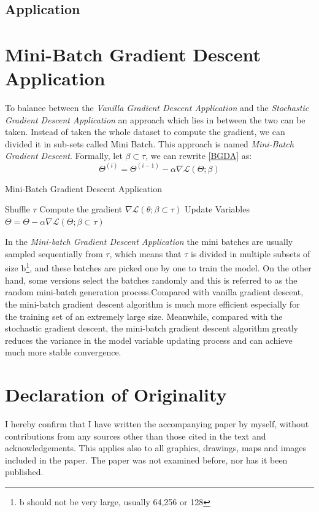 \documentclass[conference]{IEEEtran}
\begin{document}
\subsection{Application}


\section{Mini-Batch Gradient Descent Application}


To balance between the \textit{Vanilla Gradient Descent Application} and the  \textit{Stochastic Gradient Descent Application} an approach which lies in between the two can be taken. Instead of taken the whole dataset to compute the gradient, we can divided it in sub-sets called Mini Batch. This approach is named \textit{Mini-Batch Gradient Descent}. 
Formally, let $\beta \subset \tau$, we can rewrite \eqref{BGDA} as:
\begin{equation}
    \Theta^{(i)} = \Theta^{(i-1)} - \alpha\nabla\mathscr{L}(\Theta;\beta )\label{eq:MBGDA}
\end{equation}

\begin{algorithm}
\caption{Mini-Batch Gradient Descent Application}\label{MBGDA}
\begin{algorithmic}[1]
\State Shuffle $\tau$
\State Compute the gradient $\nabla\mathscr{L}(\theta;\beta \subset \tau)$
\State Update Variables $\Theta = \Theta -\alpha\nabla\mathscr{L}(\Theta;\beta \subset \tau)$
\EndFor
\EndFor
{}
\end{algorithmic}
\end{algorithm}
In the \textit{Mini-batch Gradient Descent Application} the mini batches are usually sampled sequentially from $\tau$, which means that $\tau$ is divided in multiple subsets of size b\footnote{b should not be very large, usually 64,256 or 128}, and these batches are picked one by one to train the model. On the other hand, some versions select the batches randomly and this is referred to as the random mini-batch generation process.Compared with vanilla gradient descent, the mini-batch gradient descent algorithm is much more efficient especially for the training set of an extremely large size. Meanwhile, compared with the stochastic gradient descent, the mini-batch gradient descent algorithm greatly reduces the variance in the model variable updating process and can achieve much more stable convergence.\cite{JZ2019}

\newpage
\section{Declaration of Originality}
I hereby confirm that I have written the accompanying paper by myself, without contributions from any sources other than those cited in the text and acknowledgements.
This applies also to all graphics, drawings, maps and images included in the paper.
The paper was not examined before, nor has it been published.


 
\end{document}
